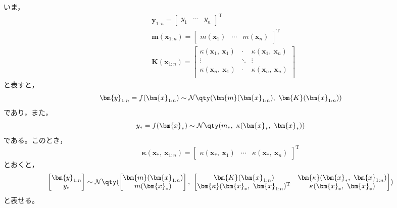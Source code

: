 \documentclass[class=jsarticle, crop=false, dvipdfmx, fleqn]{standalone}
\begin{document}
いま，
\begin{align}
    & \bm{y}_{1:n} =
        \begin{bmatrix}
            y_1 & \cdots & y_n
        \end{bmatrix}^\mathrm{T} \\
    & \bm{m}(\bm{x}_{1:n}) =
        \begin{bmatrix}
            m(\bm{x}_1) & \cdots & m(\bm{x}_n)
        \end{bmatrix}^\mathrm{T} \\
    & \bm{K}(\bm{x}_{1:n}) =
        \begin{bmatrix}
            \kappa(\bm{x}_1,\ \bm{x}_1) & \cdot & \kappa(\bm{x}_1,\ \bm{x}_n) \\
            \vdots & \ddots & \vdots \\
            \kappa(\bm{x}_n,\ \bm{x}_1) & \cdot & \kappa(\bm{x}_n,\ \bm{x}_n) \\
        \end{bmatrix}
\end{align}
と表すと，
\begin{equation}
    \bm{y}_{1:n}
        = f(\bm{x}_{1:n})
        \sim \mathcal{N}\qty(\bm{m}(\bm{x}_{1:n}),\ \bm{K}(\bm{x}_{1:n}))
\end{equation}
であり，また，
\begin{equation}
    y_{*} = f(\bm{x}_{*}) \sim \mathcal{N}\qty(m_{*},\ \kappa(\bm{x}_{*},\ \bm{x}_{*}))
\end{equation}
である。このとき，
\begin{equation}
    \bm{\kappa}(\bm{x}_{*},\ \bm{x}_{1:n}) =
        \begin{bmatrix}
            \kappa(\bm{x}_{*},\ \bm{x}_1) & \cdots & \kappa(\bm{x}_{*},\ \bm{x}_n)
        \end{bmatrix}^\mathrm{T}
\end{equation}
とおくと，
\begin{equation}
    \begin{bmatrix}
        \bm{y}_{1:n} \\ y_{*}
    \end{bmatrix}
        \sim \mathcal{N}\qty(
            \begin{bmatrix}
                \bm{m}(\bm{x}_{1:n}) \\ m(\bm{x}_{*})
            \end{bmatrix}
            ,\ 
            \begin{bmatrix}
                \bm{K}(\bm{x}_{1:n}) & \bm{\kappa}(\bm{x}_{*},\ \bm{x}_{1:n}) \\
                \bm{\kappa}(\bm{x}_{*},\ \bm{x}_{1:n})^\mathrm{T} & \kappa(\bm{x}_{*},\ \bm{x}_{*})
            \end{bmatrix}
            )
\end{equation}
と表せる。
\end{document}
